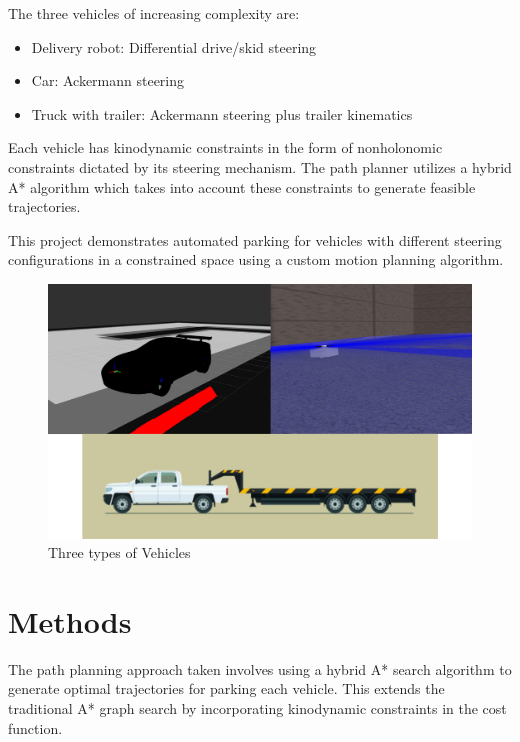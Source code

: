 \documentclass[12pt,a4paper]{article}
\begin{document}
The three vehicles of increasing complexity are:
\begin{itemize}
    \item Delivery robot: Differential drive/skid steering
    \item Car: Ackermann steering
    \item Truck with trailer: Ackermann steering plus trailer kinematics 
\end{itemize}
Each vehicle has kinodynamic constraints in the form of nonholonomic constraints dictated by its steering mechanism. The path planner utilizes a hybrid A* algorithm which takes into account these constraints to generate feasible trajectories.\par

This project demonstrates automated parking for vehicles with different steering configurations in a constrained space using a custom motion planning algorithm.\par
\begin{figure}[htbp!]
\begin{center}
\includegraphics[width=1.0 \columnwidth]{images/3_models.jpeg}
\end{center}
\caption{Three types of Vehicles}
\label{fig:Occupancy_grid}
\end{figure}
\pagebreak



\section{Methods}\label{sec:methods}

The path planning approach taken involves using a hybrid A* search algorithm to generate optimal trajectories for parking each vehicle. This extends the traditional A* graph search by incorporating kinodynamic constraints in the cost function.
\end{document}
